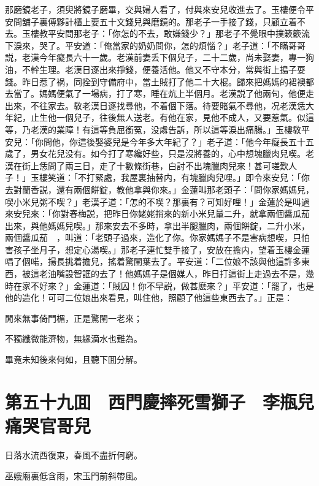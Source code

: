 那磨鏡老子，須臾將鏡子磨畢，交與婦人看了，付與來安兒收進去了。玉樓便令平安問舖子裏傅夥計櫃上要五十文錢兒與磨鏡的。那老子一手接了錢，只顧立着不去。玉樓教平安問那老子：「你怎的不去，敢嫌錢少？」那老子不覺眼中撲簌簌流下淚來，哭了。平安道：「俺當家的奶奶問你，怎的煩惱？」老子道：「不瞞哥哥説，老漢今年癡長六十一歲。老漢前妻丢下個兒子，二十二歲，尚未娶妻，專一狗油，不幹生理。老漢日逐出來掙錢，便養活他。他又不守本分，常與街上搗子耍錢。昨日惹了祸，同拴到守備府中，當土賊打了他二十大棍。歸來把媽媽的裙襖都去當了。媽媽便氣了一場病，打了寒，睡在炕上半個月。老漢説了他兩句，他便走出來，不往家去。敎老漢日逐找尋他，不着個下落。待要賭氣不尋他，况老漢恁大年紀，止生他一個兒子，往後無人送老。有他在家，見他不成人，又要惹氣。似這等，乃老漢的業障！有這等負屈銜冤，没䖏告訴，所以這等淚出痛腸。」玉樓敎平安兒：「你問他，你這後娶婆兒是今年多大年紀了？」老子道：「他今年癡長五十五歲了，男女花兒没有。如今打了寒纔好些，只是沒將養的，心中想塊臘肉兒喫。老漢在街上恁問了兩三日，走了十數條街巷，白討不出塊臘肉兒來！甚可嗟歎人子！」玉樓笑道：「不打緊處，我屋裏抽替内，有塊臘肉兒哩。」即令來安兒：「你去對蘭香説，還有兩個餅錠，教他拿與你來。」金蓮叫那老頭子：「問你家媽媽兒，喫小米兒粥不喫？」老漢子道：「怎的不喫？那裏有？可知好哩！」金蓮於是叫過來安兒來：「你對春梅説，把昨日你姥姥捎來的新小米兒量二升，就拿兩個醬瓜茄出來，與他媽媽兒喫。」那來安去不多時，拿出半腿臘肉，兩個餅錠，二升小米，兩個醬瓜茄　，叫道：「老頭子過來，造化了你。你家媽媽子不是害病想喫，只怕害孩子坐月子，想定心湯喫。」那老子連忙雙手接了，安放在擔内，望着玉樓金蓮唱了個喏，揚長挑着擔兒，搖着驚閨葉去了。平安道：「二位娘不該與他這許多東西，被這老油嘴設智誆的去了！他媽媽子是個媒人，昨日打這街上走過去不是，幾時在家不好來？」金蓮道：「賊囚！你不早説，做甚麽來？」平安道：「罷了，也是他的造化！可可二位娘出來看見，叫住他，照顧了他這些東西去了。」正是：

閒來無事倚門楣，正是驚閨一老來；

不獨纖微能濟物，無緣滴水也難為。

畢竟未知後來何如，且聽下囬分解。

\chapter*{第五十九囬　西門慶摔死雪獅子　李瓶兒痛哭官哥兒}

日落水流西復東，春風不盡折何窮。

巫娥廟裏低含雨，宋玉門前斜帶風。

